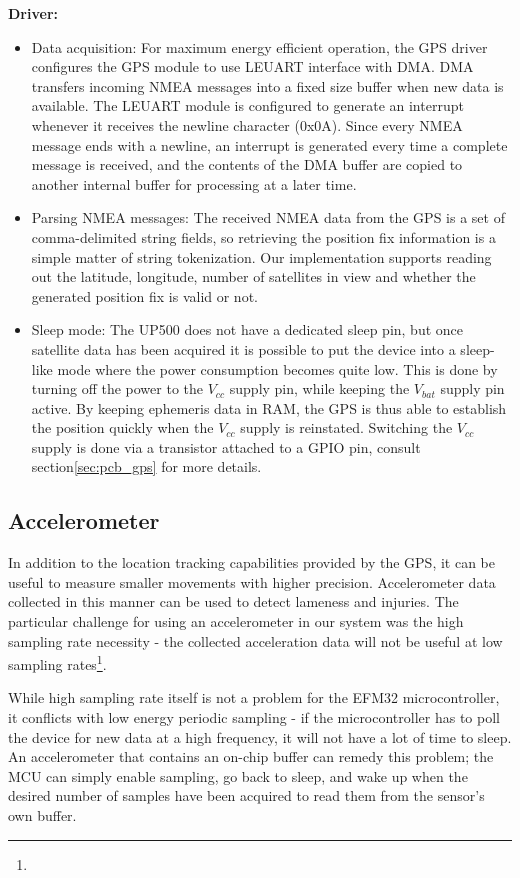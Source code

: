 \textbf{Driver:}
\begin{itemize}
\item{Data acquisition:}
For maximum energy efficient operation, the GPS driver configures the GPS module to use LEUART interface with DMA. DMA transfers incoming NMEA messages into a fixed size buffer when new data is available. The LEUART module is configured to generate an interrupt whenever it receives the newline character (0x0A). Since every NMEA message ends with a newline, an interrupt is generated every time a complete message is received, and the contents of the DMA buffer are copied to another internal buffer for processing at a later time.

\item{Parsing NMEA messages:} 
The received NMEA data from the GPS is a set of comma-delimited string fields, so retrieving the position fix information is a simple matter of string tokenization. Our implementation supports reading out the latitude, longitude, number of satellites in view and whether the generated position fix is valid or not.

\item{Sleep mode:} The UP500 does not have a dedicated sleep pin, but once satellite data has been acquired it is possible to put the device into a sleep-like mode where the power consumption becomes quite low. This is done by turning off the power to the $V_{cc}$ supply pin, while keeping the $V_{bat}$ supply pin active. By keeping ephemeris data in RAM, the GPS is thus able to establish the position quickly when the $V_{cc}$ supply is reinstated. Switching the $V_{cc}$ supply is done via a transistor attached to a GPIO pin, consult section\ref{sec:pcb_gps} for more details.
\end{itemize}


\subsection{Accelerometer}
In addition to the location tracking capabilities provided by the GPS, it can be useful to measure smaller movements with higher precision. Accelerometer data collected in this manner can be used to detect lameness and injuries. The particular challenge for using an accelerometer in our system was the high sampling rate necessity - the collected acceleration data will not be useful at low sampling rates\footnote{}. 

While high sampling rate itself is not a problem for the EFM32 microcontroller, it conflicts with low energy periodic sampling - if the microcontroller has to poll the device for new data at a high frequency, it will not have a lot of time to sleep. An accelerometer that contains an on-chip buffer can remedy this problem; the MCU can simply enable sampling, go back to sleep, and wake up when the desired number of samples have been acquired to read them from the sensor's own buffer.


